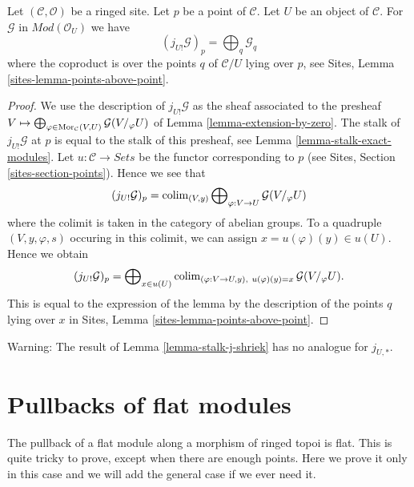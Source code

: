 \begin{lemma}
\label{lemma-stalk-j-shriek}
Let $(\mathcal{C}, \mathcal{O})$ be a ringed site.
Let $p$ be a point of $\mathcal{C}$. Let $U$ be an object of $\mathcal{C}$.
For $\mathcal{G}$ in $\textit{Mod}(\mathcal{O}_U)$ we have
$$
(j_{U!}\mathcal{G})_p =
\bigoplus\nolimits_q \mathcal{G}_q
$$
where the coproduct is over the points $q$ of $\mathcal{C}/U$
lying over $p$, see
Sites, Lemma \ref{sites-lemma-points-above-point}.
\end{lemma}

\begin{proof}
We use the description of $j_{U!}\mathcal{G}$ as the sheaf associated
to the presheaf
$V \mapsto
\bigoplus\nolimits_{\varphi \in \mathop{\rm Mor}\nolimits_\mathcal{C}(V, U)}
\mathcal{G}(V/_\varphi U)$
of
Lemma \ref{lemma-extension-by-zero}.
The stalk of $j_{U!}\mathcal{G}$ at $p$ is equal to the
stalk of this presheaf, see
Lemma \ref{lemma-stalk-exact-modules}.
Let $u : \mathcal{C} \to \textit{Sets}$ be the functor corresponding
to $p$ (see Sites, Section \ref{sites-section-points}).
Hence we see that
$$
(j_{U!}\mathcal{G})_p = \mathop{\rm colim}\nolimits_{(V, y)}
\bigoplus\nolimits_{\varphi : V \to U} \mathcal{G}(V/_\varphi U)
$$
where the colimit is taken in the category of abelian groups.
To a quadruple $(V, y, \varphi, s)$ occuring in this colimit, we can assign
$x = u(\varphi)(y) \in u(U)$. Hence we obtain
$$
(j_{U!}\mathcal{G})_p =
\bigoplus\nolimits_{x \in u(U)}
\mathop{\rm colim}\nolimits_{(\varphi : V \to U, y), \ u(\varphi)(y) = x} \mathcal{G}(V/_\varphi U).
$$
This is equal to the expression of the lemma by the description
of the points $q$ lying over $x$ in
Sites, Lemma \ref{sites-lemma-points-above-point}.
\end{proof}

\begin{remark}
\label{remark-not-pushforward}
Warning: The result of
Lemma \ref{lemma-stalk-j-shriek}
has no analogue for $j_{U, *}$.
\end{remark}












\section{Pullbacks of flat modules}
\label{section-pullback-flat}

\noindent
The pullback of a flat module along a morphism of ringed topoi
is flat. This is quite tricky to prove, except when there are
enough points. Here we prove it only in this case and we will add
the general case if we ever need it.

